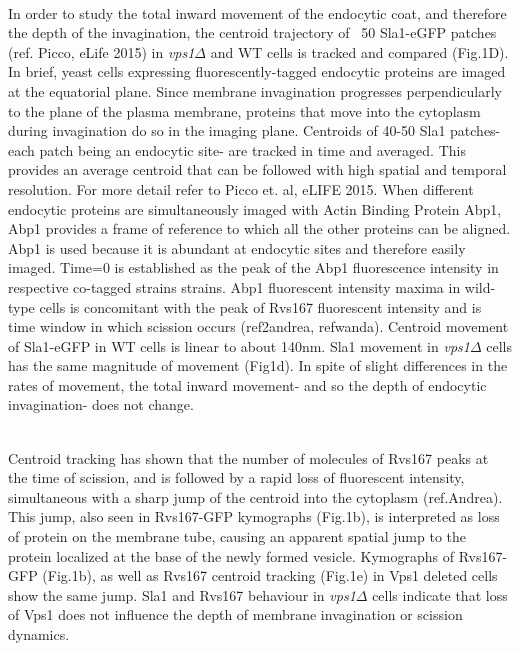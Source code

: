 \documentclass[9pt,lineno]{elife}
\begin{document}
~\\

In order to study the total inward movement of the endocytic coat, and therefore the depth of the invagination, the centroid trajectory of ~50 Sla1-eGFP patches (ref. Picco, eLife 2015) in \textit{vps1$\Delta$} and WT cells is tracked and compared (Fig.1D). In brief, yeast cells expressing fluorescently-tagged endocytic proteins are imaged at the equatorial plane. Since membrane invagination progresses perpendicularly to the plane of the plasma membrane, proteins that move into the cytoplasm during invagination do so in the imaging plane. Centroids of 40-50 Sla1 patches- each patch being an endocytic site- are tracked in time and averaged. This provides an average centroid that can be followed with high spatial and temporal resolution. For more detail refer to Picco et. al, eLIFE 2015.
When different endocytic proteins are simultaneously imaged with Actin Binding Protein Abp1, Abp1 provides a frame of reference to which all the other proteins can be aligned. Abp1 is used because it is abundant at endocytic sites and therefore easily imaged. Time=0 is established as the peak of the Abp1 fluorescence intensity in respective co-tagged strains strains. Abp1 fluorescent intensity maxima in wild-type cells is concomitant with the peak of Rvs167 fluorescent intensity and is time window in which scission occurs (ref2andrea, refwanda).  
Centroid movement of Sla1-eGFP in WT cells is linear to about 140nm. Sla1 movement in \textit{vps1$\Delta$} cells has the same magnitude of movement (Fig1d). In spite of slight differences in the rates of movement, the total inward movement- and so the depth of endocytic invagination- does not change. 

~\\

Centroid tracking has shown that the number of molecules of Rvs167 peaks at the time of scission, and is followed by a rapid loss of fluorescent intensity, simultaneous with a sharp jump of the centroid into the cytoplasm (ref.Andrea). This jump, also seen in Rvs167-GFP kymographs (Fig.1b), is interpreted as loss of protein on the membrane tube, causing an apparent spatial jump to the protein localized at the base of the newly formed vesicle. Kymographs of Rvs167-GFP (Fig.1b), as well as Rvs167 centroid tracking (Fig.1e) in Vps1 deleted cells show the same jump. Sla1 and Rvs167 behaviour in \textit{vps1$\Delta$} cells  indicate that loss of Vps1 does not influence the depth of membrane invagination or scission dynamics.
~\\
\end{document}
